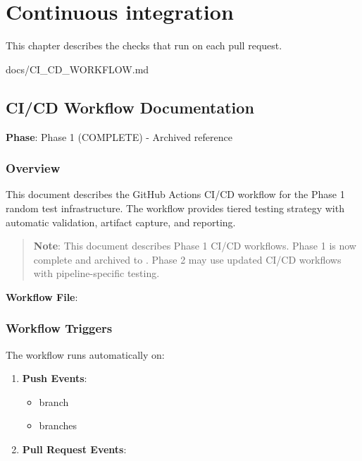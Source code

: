 \chapter{Continuous integration}\label{um:ch:continuous-integration}

This chapter describes the checks that run on each pull request.

\begin{relocated}{docs/CI_CD_WORKFLOW.md}
\section{CI/CD Workflow Documentation}\label{um:flow:ci-cd-workflow}

\textbf{Phase}: Phase 1 (COMPLETE) - Archived reference

\subsection{Overview}\label{um:flow:ci-cd-workflow:overview}

This document describes the GitHub Actions CI/CD workflow for the Phase
1 random test infrastructure. The workflow provides tiered testing
strategy with automatic validation, artifact capture, and reporting.

\begin{quote}
\textbf{Note}: This document describes Phase 1 CI/CD workflows. Phase 1
is now complete and archived to . Phase 2 may use updated
CI/CD workflows with pipeline-specific testing.
\end{quote}

\textbf{Workflow File}: 

\subsection{Workflow Triggers}\label{um:flow:ci-cd-workflow:workflow-triggers}

The workflow runs automatically on:

\begin{enumerate}
\def\labelenumi{\arabic{enumi}.}
\item
  \textbf{Push Events}:

  \begin{itemize}
  \tightlist
  \item
     branch
  \item
     branches
  \end{itemize}
\item
  \textbf{Pull Request Events}:


\end{enumerate}
\end{relocated}
